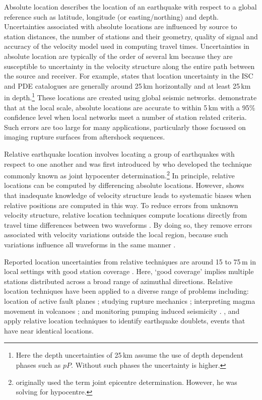 \documentclass[extra]{gji}
\begin{document}
Absolute location describes the location of an earthquake with
respect to a global reference such as latitude, longitude (or
easting/northing) and depth. Uncertainties associated with absolute
locations are influenced by source to station distances, the number
of stations and their geometry, quality of signal and accuracy of
the velocity model used in computing travel times. Uncertainties in
absolute location are typically of the order of several km because
they are susceptible to uncertainty in the velocity structure along
the entire path between the source and receiver. For example,
\citet{dr_Shearer99a} states that location uncertainty in the ISC
and PDE catalogues are generally around 25\,km horizontally and at
least 25\,km in depth.\footnote{Here the depth uncertainties of
25\,km assume the use of depth dependent phases such as $pP$.
Without such phases the uncertainty is higher.}
  These locations are created using global seismic networks.
\citet{dr_Bondar04a} demonstrate that at the local scale, absolute
locations are accurate to within 5\,km with a 95\% confidence level
when local networks meet a number of station related criteria. Such
errors are too large for many applications, particularly those
focussed on imaging rupture surfaces from aftershock sequences.

Relative earthquake location involves locating a group of
earthquakes with respect to one another and was first introduced by
\citet{dr_Douglas67a} who developed the technique commonly known as
joint hypocenter determination.\footnote{\citet{dr_Douglas67a}
originally used the term joint epicentre determination. However, he
was solving for hypocentre.} In principle, relative locations can be
computed by differencing absolute locations. However,
\citet{dr_Pavlis92a} shows that inadequate knowledge of velocity
structure leads to systematic biases when relative positions are
computed in this way. To reduce errors from unknown velocity
structure, relative location techniques compute locations directly
from travel time differences between two waveforms \citep[e.g.,
][]{dr_Ito85a, dr_Got94a, dr_Nadeau97a, dr_Waldhauser99a}. By doing
so, they remove errors associated with velocity variations outside
the local region, because such variations influence all waveforms in
the same manner \citep{dr_Shearer99a}.

Reported location uncertainties from relative techniques are  around
15 to 75\,m in local settings with good station coverage
\citep[e.g., ][]{dr_Ito85a, dr_Got94a,
dr_Waldhauser99a,dr_Waldhauser08a}. Here, `good coverage' implies
multiple stations distributed across a broad range of azimuthal
directions. Relative location techniques have been applied to a
diverse range of problems including: location of active fault planes
\citep[e.g., ][]{dr_Deichmann92a, dr_Got94a, dr_Waldhauser99a,
dr_Waldhauser02a, dr_Shearer05a}; studying rupture mechanics
\citep[e.g., ][]{dr_Rubin99a, dr_Rubin02a}; interpreting magma
movement in volcanoes \citep[e.g., ][]{dr_Fremont87a}; and
monitoring pumping induced seismicity \citep[e.g., ][]{dr_Lees98a,
dr_Ake05a}. \citet{dr_Poupinet84a}, \citet{dr_Bokelmann00a} and
\citet{dr_Rubin02b} apply relative location techniques to identify
earthquake doublets, events that have near identical locations.
\end{document}
